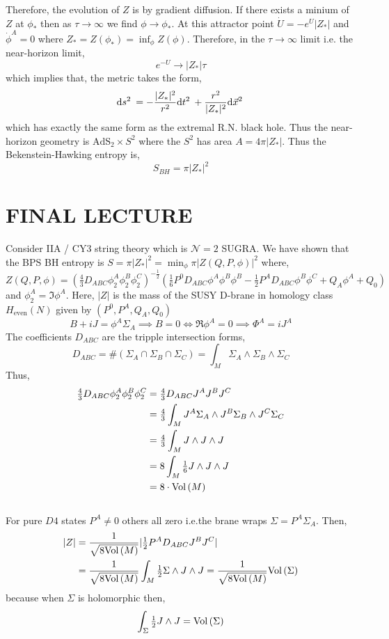 \documentclass[12pt]{extarticle}
\newcommand{\AdS}[1]{\mathrm{AdS}_{#1}}
\begin{document}
Therefore, the evolution of $Z$ is by gradient diffusion. If there exists a minium of $Z$ at $\phi_*$ then as $\tau \to \infty$ we find $\phi \to \phi_*$. At this attractor point $\dot{U} = - e^U |Z_*|$ and $\dot{\phi}^A = 0$ where $Z_* = Z(\phi_*) = \inf_{\phi} Z(\phi)$. Therefore, in the $\tau \to \infty$ limit i.e. the near-horizon limit,
\[ e^{-U} \to |Z_*| \tau  \]
which implies that, the metric takes the form,
\[ \mathrm{d}s^2 \: = - \frac{|Z_*|^2}{r^2} \mathrm{d}t^2 \: + \frac{r^2}{|Z_*|^2} \mathrm{d}\vec{x}^2 \: \]
which has exactly the same form as the extremal R.N. black hole. Thus the near-horizon geometry is $\AdS{2} \times S^2$ where the $S^2$ has area $A = 4 \pi |Z_*|$. Thus the Bekenstein-Hawking entropy is,
\[ S_{BH} = \pi |Z_*|^2 \]

\section{FINAL LECTURE}

Consider IIA / CY3 string theory which is $\mathcal{N} = 2$ SUGRA. We have shown that the BPS BH entropy is $S = \pi |Z_*|^2 = \min_\phi \pi |Z(Q, P, \phi)|^2$ where,
\[ Z(Q,P, \phi) = (\tfrac{4}{3} D_{ABC} \phi^A_2 \phi^B_2 \phi^C_2)^{-\frac{1}{2}} ( \tfrac{1}{6} P^0 D_{ABC} \phi^A \phi^B \phi^B - \tfrac{1}{2} P^A D_{ABC} \phi^B \phi^C + Q_A \phi^A + Q_0) \]
and $\phi_2^A = \Im{\phi^A}$. Here, $|Z|$ is the mass of the SUSY D-brane in homology class $H_{\text{even}}(N)$ given by $(P^0, P^A, Q_A, Q_0)$ 
\[ B + i J = \phi^A \Sigma_A \implies B = 0 \iff \Re{\phi^A} = 0 \implies \Phi^A = i J^A \]
The coefficients $D_{ABC}$ are the tripple intersection forms,
\[ D_{ABC} = \# (\Sigma_A \cap \Sigma_B \cap \Sigma_C) = \int_M \Sigma_A \wedge \Sigma_B \wedge \Sigma_C \]
Thus,
\begin{align*}
\tfrac{4}{3} D_{ABC} \phi^A_2 \phi^B_2 \phi^C_2 & = \tfrac{4}{3} D_{ABC} J^A J^B J^C 
\\
& = \tfrac{4}{3} \int_M J^A \Sigma_A \wedge J^B \Sigma_B \wedge J^C \Sigma_C 
\\
& = \tfrac{4}{3} \int_M J \wedge J \wedge J
\\
& = 8 \int_M \tfrac{1}{6} J \wedge J \wedge J
\\
& = 8 \cdot \mathrm{Vol}\left(M\right)
\end{align*}
\bigskip\\
For pure $D4$ states $P^A \neq 0$ others all zero i.e.the brane wraps $\Sigma = P^A \Sigma_A$. Then,
\begin{align*}
|Z| & = \frac{1}{\sqrt{8 \mathrm{Vol}\left(M\right)}} | \tfrac{1}{2} P^A D_{ABC} J^B J^C |
\\
& = \frac{1}{\sqrt{8 \mathrm{Vol}\left(M\right)}} \int_M \tfrac{1}{2} \Sigma \wedge J \wedge J = \frac{1}{\sqrt{8 \mathrm{Vol}\left(M\right)}} \mathrm{Vol}\left(\Sigma\right) 
\end{align*}
because when $\Sigma$ is holomorphic then,
\[ \int_\Sigma \tfrac{1}{2} J \wedge J = \mathrm{Vol}\left(\Sigma\right) \]
\end{document}
